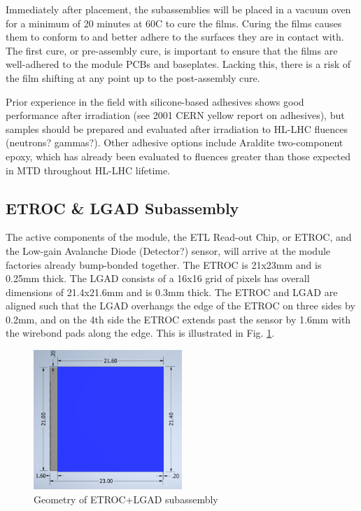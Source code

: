 \documentclass[10pt]{datasheet}
\begin{document}
Immediately after placement, the subassemblies will be placed in a  vacuum oven for a minimum of 20 minutes at 60\degree C to cure the films. Curing the films causes them to conform to and better adhere to the surfaces they are in contact with. The first cure, or pre-assembly cure, is important to ensure that the films are well-adhered to the module PCBs and baseplates. Lacking this, there is a risk of the film shifting at any point up to the post-assembly cure.

Prior experience in the field with silicone-based adhesives shows good performance after irradiation (see 2001 CERN yellow report on adhesives), but samples should be prepared and evaluated after irradiation to HL-LHC fluences (neutrons? gammas?).  Other adhesive options include Araldite two-component epoxy, which has already been evaluated to fluences greater than those expected in MTD throughout HL-LHC lifetime. 

\subsection{ETROC \& LGAD Subassembly}

The active components of the module, the ETL Read-out Chip, or ETROC, and the Low-gain Avalanche Diode (Detector?) sensor, will arrive at the module factories already bump-bonded together. The ETROC is 21x23mm and is 0.25mm thick. The LGAD consists of a 16x16 grid of pixels has overall dimensions of 21.4x21.6mm and is 0.3mm thick. The ETROC and LGAD are aligned such that the LGAD overhangs the edge of the ETROC on three sides by 0.2mm, and on the 4th side the ETROC extends past the sensor by 1.6mm with the wirebond pads along the edge. This is illustrated in Fig. \ref{fig:bbm-geometry}.

\begin{figure}[h]
	\centering
    \includegraphics[width=0.5\textwidth]{figures/ETROCpLGAD.png}
    \caption{Geometry of ETROC+LGAD subassembly}
    \label{fig:bbm-geometry}	
\end{figure}
\end{document}
